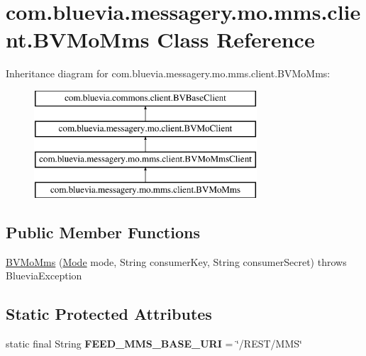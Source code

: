 \hypertarget{classcom_1_1bluevia_1_1messagery_1_1mo_1_1mms_1_1client_1_1BVMoMms}{
\section{com.bluevia.messagery.mo.mms.client.BVMoMms Class Reference}
\label{classcom_1_1bluevia_1_1messagery_1_1mo_1_1mms_1_1client_1_1BVMoMms}
}
Inheritance diagram for com.bluevia.messagery.mo.mms.client.BVMoMms:\begin{figure}[H]
\begin{center}
\leavevmode
\includegraphics[height=4.000000cm]{classcom_1_1bluevia_1_1messagery_1_1mo_1_1mms_1_1client_1_1BVMoMms}
\end{center}
\end{figure}
\subsection*{Public Member Functions}
\begin{DoxyCompactItemize}
\item 
\hyperlink{classcom_1_1bluevia_1_1messagery_1_1mo_1_1mms_1_1client_1_1BVMoMms_ad3c732b2878b5e8f8cde5b6310a87445}{BVMoMms} (\hyperlink{classcom_1_1bluevia_1_1commons_1_1client_1_1BVBaseClient_a5f4a4a27d73a8ddd0ce450a6c7a4d1b7}{Mode} mode, String consumerKey, String consumerSecret)  throws BlueviaException
\end{DoxyCompactItemize}
\subsection*{Static Protected Attributes}
\begin{DoxyCompactItemize}
\item 
\hypertarget{classcom_1_1bluevia_1_1messagery_1_1mo_1_1mms_1_1client_1_1BVMoMms_a47f8073d08c41da231b23dcd4de9ed64}{
static final String {\bfseries FEED\_\-MMS\_\-BASE\_\-URI} = \char`\"{}/REST/MMS\char`\"{}}
\label{classcom_1_1bluevia_1_1messagery_1_1mo_1_1mms_1_1client_1_1BVMoMms_a47f8073d08c41da231b23dcd4de9ed64}

\end{DoxyCompactItemize}


